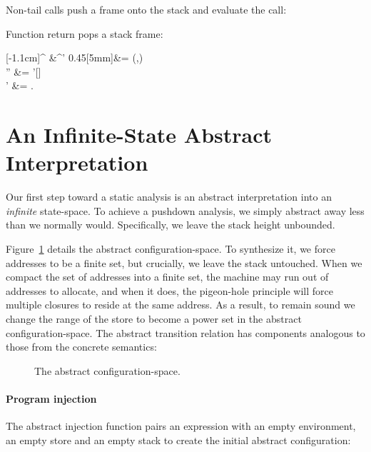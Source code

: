 \noindent
Non-tail calls push a frame onto the stack and evaluate the call:


\noindent
Function return pops a stack frame:
\begin{center}
  [-1.1cm]{^{\conf} &\To {}^{\conf'} }
  {0.45}[5mm]{\addr &= \alloc(\vv,\conf)
    \\
    \env'' &= \env'[\vv \mapsto \addr]
    \\
    \store' &= \store[\addr \mapsto \ArgEval(\aexpr,\env,\store)]
    \text.}
\end{center}
\section{An Infinite-State Abstract Interpretation}
\label{sec:abstraction}
Our first step toward a static analysis 
is an abstract interpretation
into an \emph{infinite} state-space.
To achieve a pushdown analysis,
we simply
abstract away less than we normally would.
Specifically, 
we leave the stack height unbounded.

Figure~\ref{fig:abs-conf-space}
details the 
abstract configuration-space.
To synthesize it, we force addresses to be a finite set, but
crucially, we leave the stack untouched.
When we compact the set of addresses into a finite set, the machine
may run out of addresses to allocate, and when it does, the
pigeon-hole principle will force multiple closures to reside at the
same address.
As a result, to remain sound we change the range of the store to
become a power set in the abstract configuration-space.
The abstract transition relation has  components
analogous to those from the concrete semantics:


\begin{figure}
\figrule

\captionsetup{justification=centering}
\caption{The abstract configuration-space.}
\label{fig:abs-conf-space}
\figrule
\end{figure}


              \paragraph{Program injection}
              The abstract injection function 
              pairs an expression with an empty environment, an empty store and an
              empty stack to create the initial abstract configuration:
              


